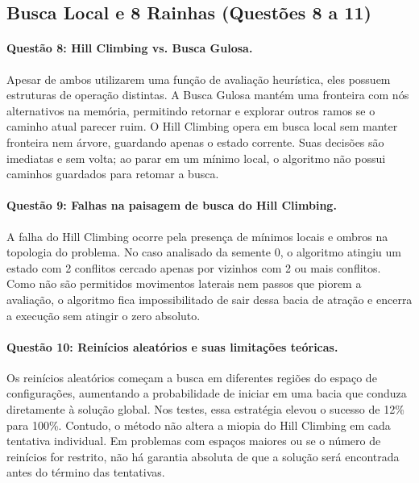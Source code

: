 \documentclass[12pt]{article}
\begin{document}
\subsection{Busca Local e 8 Rainhas (Questões 8 a 11)}

\paragraph{Questão 8: Hill Climbing vs. Busca Gulosa.}
Apesar de ambos utilizarem uma função de avaliação heurística, eles possuem estruturas de operação distintas. A Busca Gulosa mantém uma fronteira com nós alternativos na memória, permitindo retornar e explorar outros ramos se o caminho atual parecer ruim. O Hill Climbing opera em busca local sem manter fronteira nem árvore, guardando apenas o estado corrente. Suas decisões são imediatas e sem volta; ao parar em um mínimo local, o algoritmo não possui caminhos guardados para retomar a busca.

\paragraph{Questão 9: Falhas na paisagem de busca do Hill Climbing.}
A falha do Hill Climbing ocorre pela presença de mínimos locais e ombros na topologia do problema. No caso analisado da semente 0, o algoritmo atingiu um estado com 2 conflitos cercado apenas por vizinhos com 2 ou mais conflitos. Como não são permitidos movimentos laterais nem passos que piorem a avaliação, o algoritmo fica impossibilitado de sair dessa bacia de atração e encerra a execução sem atingir o zero absoluto.

\paragraph{Questão 10: Reinícios aleatórios e suas limitações teóricas.}
Os reinícios aleatórios começam a busca em diferentes regiões do espaço de configurações, aumentando a probabilidade de iniciar em uma bacia que conduza diretamente à solução global. Nos testes, essa estratégia elevou o sucesso de 12\% para 100\%. Contudo, o método não altera a miopia do Hill Climbing em cada tentativa individual. Em problemas com espaços maiores ou se o número de reinícios for restrito, não há garantia absoluta de que a solução será encontrada antes do término das tentativas.
\end{document}
